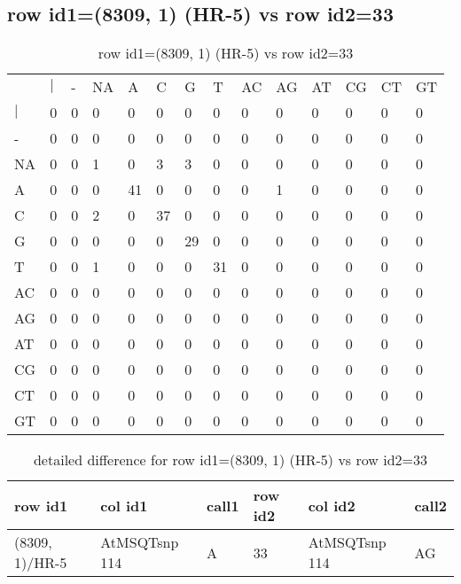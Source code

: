 \subsection{row id1=(8309, 1) (HR-5) vs row id2=33}
\begin{center}
\begin{longtable}{|l|l|l|l|l|l|l|l|l|l|l|l|l|l|}
\caption{row id1=(8309, 1) (HR-5) vs row id2=33} \label{table_dm488}\\
\hline
\\
\hline
&$|$&-&NA&A&C&G&T&AC&AG&AT&CG&CT&GT\\
$|$&0&0&0&0&0&0&0&0&0&0&0&0&0\\
-&0&0&0&0&0&0&0&0&0&0&0&0&0\\
NA&0&0&1&0&3&3&0&0&0&0&0&0&0\\
A&0&0&0&41&0&0&0&0&1&0&0&0&0\\
C&0&0&2&0&37&0&0&0&0&0&0&0&0\\
G&0&0&0&0&0&29&0&0&0&0&0&0&0\\
T&0&0&1&0&0&0&31&0&0&0&0&0&0\\
AC&0&0&0&0&0&0&0&0&0&0&0&0&0\\
AG&0&0&0&0&0&0&0&0&0&0&0&0&0\\
AT&0&0&0&0&0&0&0&0&0&0&0&0&0\\
CG&0&0&0&0&0&0&0&0&0&0&0&0&0\\
CT&0&0&0&0&0&0&0&0&0&0&0&0&0\\
GT&0&0&0&0&0&0&0&0&0&0&0&0&0\\
\hline
\end{longtable}
\end{center}

\begin{center}
\begin{longtable}{|l|l|l|l|l|l|}
\caption{detailed difference for row id1=(8309, 1) (HR-5) vs row id2=33} \label{table_dm489}\\
\hline
row id1&col id1&call1&row id2&col id2&call2\\
\hline
(8309, 1)/HR-5&AtMSQTsnp 114&A&33&AtMSQTsnp 114&AG\\
\hline
\end{longtable}
\end{center}

